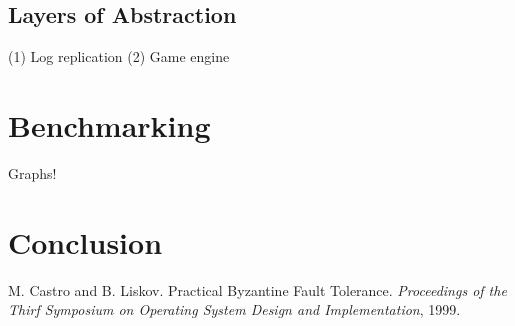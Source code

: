 \documentclass[11pt]{article}
\begin{document}
\begin{multicols}{2}
\subsection{Layers of Abstraction}

(1) Log replication
(2) Game engine

\section{Benchmarking}

Graphs!



\section{Conclusion}

\begin{thebibliography}{9}

 M. Castro and B. Liskov. Practical Byzantine Fault Tolerance. \emph{Proceedings of the Thirf Symposium on Operating System Design and Implementation}, 1999.

\end{thebibliography}



\end{multicols}
\end{document}

